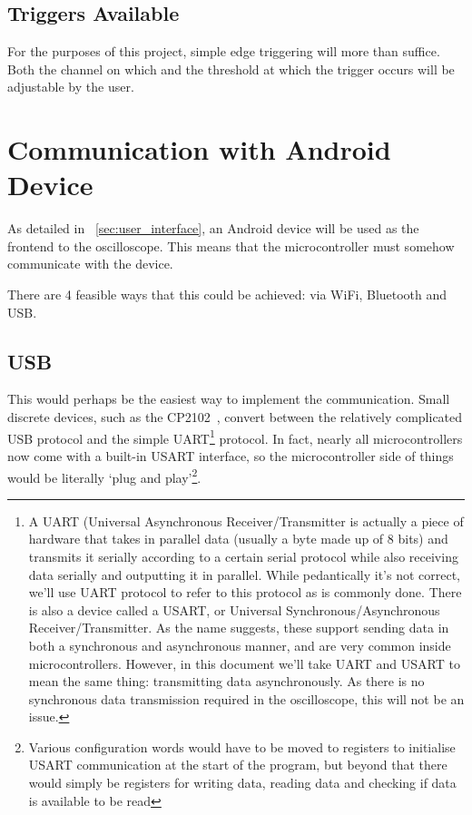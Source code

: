 \subsection*{Triggers Available}

For the purposes of this project, simple edge triggering will more than suffice.
Both the channel on which and the threshold at which the trigger occurs will be
adjustable by the user.

\section{Communication with Android Device}
\label{sec:CommOptions}

As detailed in ~\cref{sec:user_interface}, an Android device will be used as the
frontend to the oscilloscope. This means that the microcontroller must somehow
communicate with the device.

There are 4 feasible ways that this could be achieved: via WiFi, Bluetooth and
USB.

\subsection*{USB}

This would perhaps be the easiest way to implement the communication. Small
discrete devices, such as the CP2102~\autocite{CP2102}, convert between the
relatively complicated USB protocol and the simple UART\footnote{A UART
  (Universal Asynchronous Receiver/Transmitter is actually a piece of hardware
  that takes in parallel data (usually a byte made up of 8 bits) and transmits
  it serially according to a certain serial protocol while also receiving data
  serially and outputting it in parallel. While pedantically it's not correct,
  we'll use UART protocol to refer to this protocol as is commonly done. There
  is also a device called a USART, or Universal Synchronous/Asynchronous
  Receiver/Transmitter. As the name suggests, these support sending data in both
  a synchronous and asynchronous manner, and are very common inside
  microcontrollers. However, in this document we'll take UART and USART to mean
  the same thing: transmitting data asynchronously. As there is no synchronous
data transmission required in the oscilloscope, this will not be an issue.}
protocol. In fact, nearly all microcontrollers now come with a built-in USART
interface, so the microcontroller side of things would be literally `plug and
play'\footnote{Various configuration words would have to be moved to registers
  to initialise USART communication at the start of the program, but beyond that
  there would simply be registers for writing data, reading data and checking if
data is available to be read}.

